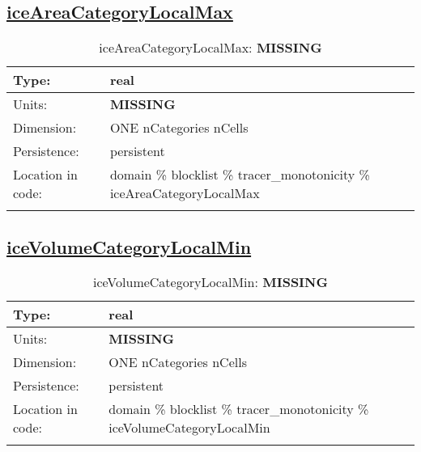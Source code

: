 \subsection[iceAreaCategoryLocalMax]{\hyperref[sec:var_tab_tracer_monotonicity]{iceAreaCategoryLocalMax}}
\label{subsec:var_sec_tracer_monotonicity_iceAreaCategoryLocalMax}
\begin{center}
\begin{longtable}{| p{2.0in} | p{4.0in} |}
        \hline 
        Type: & real \\
        \hline 
        Units: & {\bf \color{red} MISSING} \\
        \hline 
        Dimension: & ONE nCategories nCells \\
        \hline 
        Persistence: & persistent \\
        \hline 
         Location in code: & domain \% blocklist \% tracer\_monotonicity \% iceAreaCategoryLocalMax \\
         \hline 
    \caption{iceAreaCategoryLocalMax: {\bf \color{red} MISSING}}
\end{longtable}
\end{center}
\subsection[iceVolumeCategoryLocalMin]{\hyperref[sec:var_tab_tracer_monotonicity]{iceVolumeCategoryLocalMin}}
\label{subsec:var_sec_tracer_monotonicity_iceVolumeCategoryLocalMin}
\begin{center}
\begin{longtable}{| p{2.0in} | p{4.0in} |}
        \hline 
        Type: & real \\
        \hline 
        Units: & {\bf \color{red} MISSING} \\
        \hline 
        Dimension: & ONE nCategories nCells \\
        \hline 
        Persistence: & persistent \\
        \hline 
         Location in code: & domain \% blocklist \% tracer\_monotonicity \% iceVolumeCategoryLocalMin \\
         \hline 
    \caption{iceVolumeCategoryLocalMin: {\bf \color{red} MISSING}}
\end{longtable}
\end{center}
